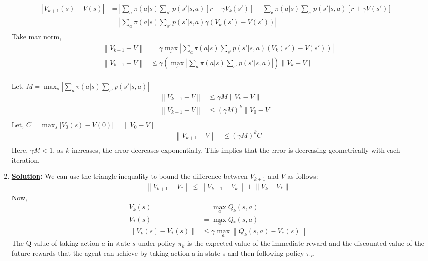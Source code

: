 \documentclass[12pt]{article}
\newcommand{\solution}{\noindent \textbf{\underline{Solution}: }}
\newcommand*{\norm}[1]{\left\lVert #1 \right\rVert}
\newcommand*{\n}[1]{\left\lvert #1 \right\rvert}
\begin{document}
\begin{enumerate}
    \begin{align*}
        \n{V_{k+1}(s) - V(s)} &= \n{\sum_{a} \pi(a|s) \sum_{s'} p(s'|s, a) [r + \gamma V_k(s')] - \sum_{a} \pi(a|s) \sum_{s'} p(s'|s, a) [r + \gamma V(s')]} \\
        &= \n{\sum_{a} \pi(a|s) \sum_{s'} p(s'|s, a) \gamma (V_k(s')-V(s'))} \\
    \end{align*}
    Take max norm,
    \begin{align*}
        \norm{V_{k+1} - V} &= \gamma \max_s \n{\sum_{a} \pi(a|s) \sum_{s'} p(s'|s, a) (V_k(s')-V(s'))} \\
        \norm{V_{k+1} - V} &\leq \gamma \left(\max_s \n{\sum_{a} \pi(a|s) \sum_{s'} p(s'|s, a)}\right) \norm{V_k-V} \\
    \end{align*}

    Let, $M= \max_s \n{\sum_{a} \pi(a|s) \sum_{s'} p(s'|s, a)}$
    \begin{align*}
        \norm{V_{k+1} - V} &\leq \gamma M \norm{V_k-V} \\
        \norm{V_{k+1} - V} &\leq (\gamma M)^k \norm{V_0-V} \\
    \end{align*}
    Let, $C = \max_s \n{V_0(s)-V(0)} = \norm{V_0-V}$
    \begin{align*}
        \norm{V_{k+1} - V} &\leq (\gamma M)^k C \\
    \end{align*}
    Here, $\gamma M < 1$, as $k$ increases, the error decreases exponentially. This implies that the error is decreasing geometrically with each iteration. 
    
    \item \solution 
    We can use the triangle inequality to bound the difference between $V_{k+1}$ and $V$ as follows:
    \begin{align*}
        \norm{V_{k+1}-V_{*}} \leq \norm{V_{k+1}-V_k} + \norm{V_k-V_{*}}
    \end{align*}
    Now, 
    \begin{align*}
        V_k(s) &= \max_{a} Q_k(s,a)\\
        V_*(s) &= \max_{a} Q_*(s,a) \\
        \norm{V_k(s)-V_{*}(s)} &\leq \gamma \max_a \norm{Q_k(s,a)-V_*(s)} 
    \end{align*}
    The Q-value of taking action $a$ in state $s$ under policy $\pi_k$ is the expected value of the immediate reward 
    and the discounted value of the future rewards that the agent can achieve by taking action a in state s and then following policy $\pi_k$.


\end{enumerate}
\end{document}
